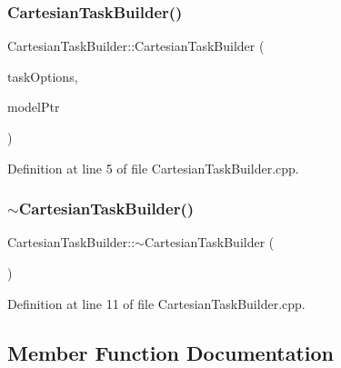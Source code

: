 \subsubsection{\texorpdfstring{Cartesian\+Task\+Builder()}{CartesianTaskBuilder()}}
{\footnotesize\ttfamily Cartesian\+Task\+Builder\+::\+Cartesian\+Task\+Builder (\begin{DoxyParamCaption}\item[{const \hyperlink{classocra_1_1TaskBuilderOptions}{Task\+Builder\+Options} \&}]{task\+Options,  }\item[{Model\+::\+Ptr}]{model\+Ptr }\end{DoxyParamCaption})}



Definition at line 5 of file Cartesian\+Task\+Builder.\+cpp.

\hypertarget{classocra_1_1CartesianTaskBuilder_aecc30a79dfbeaf935d302a3f1e2c3fac}{}\label{classocra_1_1CartesianTaskBuilder_aecc30a79dfbeaf935d302a3f1e2c3fac} 
\subsubsection{\texorpdfstring{$\sim$\+Cartesian\+Task\+Builder()}{~CartesianTaskBuilder()}}
{\footnotesize\ttfamily Cartesian\+Task\+Builder\+::$\sim$\+Cartesian\+Task\+Builder (\begin{DoxyParamCaption}{ }\end{DoxyParamCaption})\hspace{0.3cm}{\ttfamily [virtual]}}



Definition at line 11 of file Cartesian\+Task\+Builder.\+cpp.



\subsection{Member Function Documentation}
\hypertarget{classocra_1_1CartesianTaskBuilder_a58c8e4a299db03180c058eefcd711052}{}\label{classocra_1_1CartesianTaskBuilder_a58c8e4a299db03180c058eefcd711052} 
